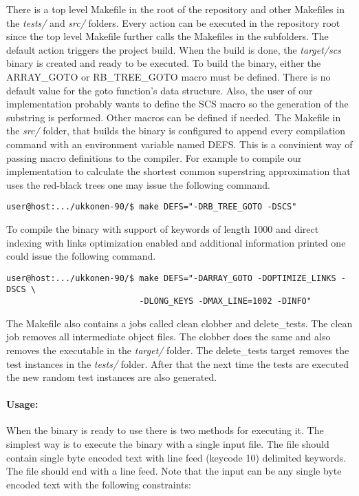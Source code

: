 \documentclass[english,twoside,censored,csm,algorithms-track-2020]{HYthesisML}
\theoremstyle{plain}
\theoremstyle{definition}
\begin{document}
There is a top level Makefile in the root of the repository and other Makefiles in the \textit{tests/}
and \textit{src/} folders. Every action can be executed in the repository root since the top level
Makefile further calls the Makefiles in the subfolders. The default action triggers the project build.
When the build is done, the \textit{target/scs} binary is created and ready to be executed. To build
the binary, either the ARRAY\_GOTO or RB\_TREE\_GOTO macro must be defined. There is no default value
for the goto function's data structure. Also, the user of our implementation probably wants to define
the SCS macro so the generation of the substring is performed. Other macros can be defined if needed.
The Makefile in the \textit{src/} folder, that builds the binary is configured to append every
compilation command with an environment variable named DEFS. This is a convinient way of passing
macro definitions to the compiler. For example to compile our implementation to calculate the
shortest common superstring approximation that uses the red-black trees one may issue the following
command.

\begin{verbatim}
user@host:.../ukkonen-90/$ make DEFS="-DRB_TREE_GOTO -DSCS"
\end{verbatim}

To compile the binary with support of keywords of length 1000 and direct indexing with links optimization enabled and additional information printed one could issue the following command.

\begin{verbatim}
user@host:.../ukkonen-90/$ make DEFS="-DARRAY_GOTO -DOPTIMIZE_LINKS -DSCS \
                           -DLONG_KEYS -DMAX_LINE=1002 -DINFO"
\end{verbatim}

The Makefile also contains a jobs called clean clobber and delete\_tests. The clean job removes all
intermediate object files. The clobber does the same and also removes the executable in the
\textit{target/} folder. The delete\_tests target removes the test instances in the \textit{tests/}
folder. After that the next time the tests are executed the new random test instances are also generated.

\paragraph{Usage:}
When the binary is ready to use there is two methods for executing it. The simplest way is to
execute the binary with a single input file. The file should contain single byte encoded text with
line feed (keycode 10) delimited keywords. The file should end with a line feed. Note that the input
can be any single byte encoded text with the following constraints:
\end{document}
